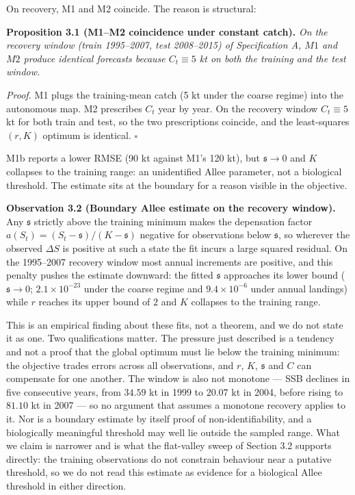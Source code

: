 \documentclass[11pt]{article}
\begin{document}
On recovery, M1 and M2 coincide. The reason is structural:

\textbf{Proposition 3.1 (M1--M2 coincidence under constant catch).}
\emph{On the recovery window (train 1995--2007, test 2008--2015) of
Specification A, \(M1\) and \(M2\) produce identical forecasts because
\(C_t\equiv 5\) kt on both the training and the test window.}

\emph{Proof.} M1 plugs the training-mean catch (5 kt under the coarse
regime) into the autonomous map. M2 prescribes \(C_t\) year by year. On
the recovery window \(C_t\equiv 5\) kt for both train and test, so the
two prescriptions coincide, and the least-squares \((r,K)\) optimum is
identical. \ensuremath{\square}

M1b reports a lower RMSE (90 kt against M1's 120 kt), but
\(\mathfrak s\to 0\) and \(K\) collapses to the training range: an
unidentified Allee parameter, not a biological threshold. The estimate
sits at the boundary for a reason visible in the objective.

\textbf{Observation 3.2 (Boundary Allee estimate on the recovery
window).} Any \(\mathfrak s\) strictly above the training minimum makes
the depensation factor
\(a(S_t)=(S_t-\mathfrak s)/(K-\mathfrak s)\) negative for observations
below \(\mathfrak s\), so wherever the observed \(\Delta S\) is positive
at such a state the fit incurs a large squared residual. On the
1995--2007 recovery window most annual increments are positive, and this
penalty pushes the estimate downward: the fitted \(\mathfrak s\)
approaches its lower bound (\(\mathfrak s \to 0\); \(2.1\times10^{-23}\)
under the coarse regime and \(9.4\times10^{-6}\) under annual landings)
while \(r\) reaches its upper bound of \(2\) and \(K\) collapses to the
training range.

This is an empirical finding about these fits, not a theorem, and we do
not state it as one. Two qualifications matter. The pressure just
described is a tendency and not a proof that the global optimum must lie
below the training minimum: the objective trades errors across all
observations, and \(r\), \(K\), \(\mathfrak s\) and \(C\) can compensate
for one another. The window is also not monotone --- SSB declines in
five consecutive years, from \(34.59\) kt in 1999 to \(20.07\) kt in
2004, before rising to \(81.10\) kt in 2007 --- so no argument that
assumes a monotone recovery applies to it. Nor is a boundary estimate by
itself proof of non-identifiability, and a biologically meaningful
threshold may well lie outside the sampled range. What we claim is
narrower and is what the flat-valley sweep of Section 3.2 supports
directly: the training observations do not constrain behaviour near a
putative threshold, so we do not read this estimate as evidence for a
biological Allee threshold in either direction.
\end{document}
